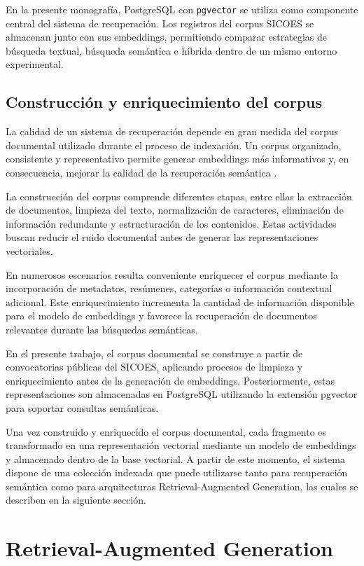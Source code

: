 En la presente monografía, PostgreSQL con \texttt{pgvector} se utiliza como componente central del sistema de recuperación. Los registros del corpus SICOES se almacenan junto con sus embeddings, permitiendo comparar estrategias de búsqueda textual, búsqueda semántica e híbrida dentro de un mismo entorno experimental.

\subsection{Construcción y enriquecimiento del corpus}

La calidad de un sistema de recuperación depende en gran medida del corpus documental utilizado durante el proceso de indexación. Un corpus organizado, consistente y representativo permite generar embeddings más informativos y, en consecuencia, mejorar la calidad de la recuperación semántica \parencite{manning2008ir}.

La construcción del corpus comprende diferentes etapas, entre ellas la extracción de documentos, limpieza del texto, normalización de caracteres, eliminación de información redundante y estructuración de los contenidos. Estas actividades buscan reducir el ruido documental antes de generar las representaciones vectoriales.

En numerosos escenarios resulta conveniente enriquecer el corpus mediante la incorporación de metadatos, resúmenes, categorías o información contextual adicional. Este enriquecimiento incrementa la cantidad de información disponible para el modelo de embeddings y favorece la recuperación de documentos relevantes durante las búsquedas semánticas.

En el presente trabajo, el corpus documental se construye a partir de convocatorias públicas del SICOES, aplicando procesos de limpieza y enriquecimiento antes de la generación de embeddings. Posteriormente, estas representaciones son almacenadas en PostgreSQL utilizando la extensión pgvector para soportar consultas semánticas.

Una vez construido y enriquecido el corpus documental, cada fragmento es transformado en una representación vectorial mediante un modelo de embeddings y almacenado dentro de la base vectorial. A partir de este momento, el sistema dispone de una colección indexada que puede utilizarse tanto para recuperación semántica como para arquitecturas Retrieval-Augmented Generation, las cuales se describen en la siguiente sección.
\section{Retrieval-Augmented Generation}

